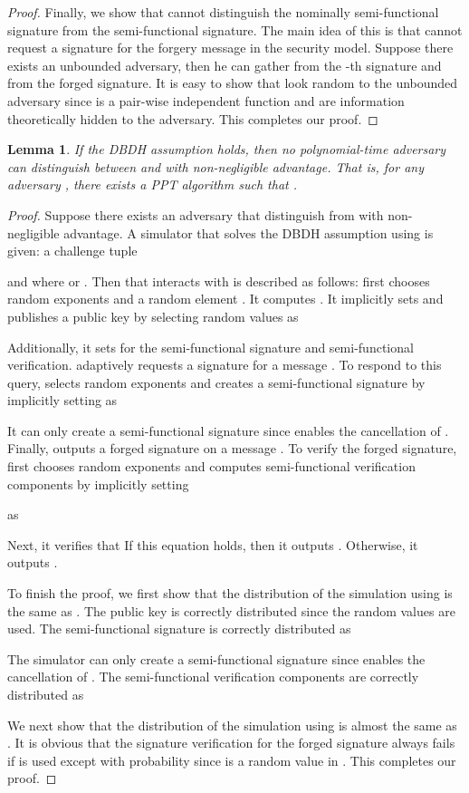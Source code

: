 \documentclass[11pt,letterpaper]{article}
\newcommand{\vs}{\vspace{1.5mm}}
\newtheorem{lemma}[theorem]{Lemma}
\begin{document}
\begin{proof}
Finally, we show that  cannot distinguish the nominally
semi-functional signature from the semi-functional signature. The main idea
of this is that  cannot request a signature for the forgery message
 in the security model. Suppose there exists an unbounded adversary,
then he can gather  from the -th signature and  from the forged signature. It is easy to show that  look random
to the unbounded adversary since  is a pair-wise independent
function and  are information theoretically hidden to the adversary.
This completes our proof.
\end{proof}

\begin{lemma} \label{lem:pks2-prime-3}
If the DBDH assumption holds, then no polynomial-time adversary can
distinguish between  and  with non-negligible advantage.
That is, for any adversary , there exists a PPT algorithm 
such that
    .
\end{lemma}

\begin{proof}
Suppose there exists an adversary  that distinguish  from
 with non-negligible advantage. A simulator  that solves
the DBDH assumption using  is given: a challenge tuple
    
    and  where  or .
Then  that interacts with  is described as follows:
 first chooses random exponents  and a random element . It computes
    .
It implicitly sets  and
publishes a public key  by selecting random values  as
    
Additionally, it sets  for the semi-functional
signature and semi-functional verification.  adaptively requests a
signature for a message . To respond to this query,  selects
random exponents  and creates a
semi-functional signature by implicitly setting  as
    
It can only create a semi-functional signature since  enables the
cancellation of . Finally,  outputs a forged signature
 on a message . To verify the
forged signature,  first chooses random exponents  and computes semi-functional verification components by
implicitly setting
    
as
    
Next, it verifies that  If
this equation holds, then it outputs . Otherwise, it outputs .

\vs To finish the proof, we first show that the distribution of the
simulation using  is the same as . The
public key is correctly distributed since the random values  are used. The semi-functional signature is correctly distributed as
    
The simulator can only create a semi-functional signature since  enables the cancellation of . The semi-functional
verification components are correctly distributed as
    
We next show that the distribution of the simulation using  is almost the same as . It is obvious that the
signature verification for the forged signature always fails if  is used except with  probability since  is a random value
in .
This completes our proof.
\end{proof}
\end{document}
